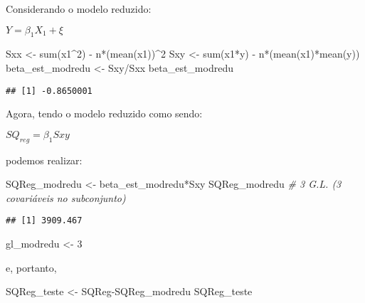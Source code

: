 \documentclass[
]{article}
\newenvironment{Shaded}{\begin{snugshade}}{\end{snugshade}}
\newcommand{\CommentTok}[1]{\textcolor[rgb]{0.56,0.35,0.01}{\textit{#1}}}
\newcommand{\DecValTok}[1]{\textcolor[rgb]{0.00,0.00,0.81}{#1}}
\newcommand{\FunctionTok}[1]{\textcolor[rgb]{0.00,0.00,0.00}{#1}}
\newcommand{\NormalTok}[1]{#1}
\newcommand{\OtherTok}[1]{\textcolor[rgb]{0.56,0.35,0.01}{#1}}
\newcommand{\SpecialCharTok}[1]{\textcolor[rgb]{0.00,0.00,0.00}{#1}}
\begin{document}
Considerando o modelo reduzido:

\(Y= \beta_1X_1 + \xi\)

\begin{Shaded}
\begin{Highlighting}[]
\NormalTok{Sxx }\OtherTok{\textless{}{-}} \FunctionTok{sum}\NormalTok{(x1}\SpecialCharTok{\^{}}\DecValTok{2}\NormalTok{) }\SpecialCharTok{{-}}\NormalTok{ n}\SpecialCharTok{*}\NormalTok{(}\FunctionTok{mean}\NormalTok{(x1))}\SpecialCharTok{\^{}}\DecValTok{2}
\NormalTok{Sxy }\OtherTok{\textless{}{-}} \FunctionTok{sum}\NormalTok{(x1}\SpecialCharTok{*}\NormalTok{y) }\SpecialCharTok{{-}}\NormalTok{ n}\SpecialCharTok{*}\NormalTok{(}\FunctionTok{mean}\NormalTok{(x1)}\SpecialCharTok{*}\FunctionTok{mean}\NormalTok{(y))}
\NormalTok{beta\_est\_modredu }\OtherTok{\textless{}{-}}\NormalTok{ Sxy}\SpecialCharTok{/}\NormalTok{Sxx}
\NormalTok{beta\_est\_modredu}
\end{Highlighting}
\end{Shaded}

\begin{verbatim}
## [1] -0.8650001
\end{verbatim}

Agora, tendo o modelo reduzido como sendo:

\(SQ_{reg} = \beta_1Sxy\)

podemos realizar:

\begin{Shaded}
\begin{Highlighting}[]
\NormalTok{SQReg\_modredu }\OtherTok{\textless{}{-}}\NormalTok{ beta\_est\_modredu}\SpecialCharTok{*}\NormalTok{Sxy}
\NormalTok{SQReg\_modredu }\CommentTok{\# 3 G.L. (3 covariáveis no subconjunto)}
\end{Highlighting}
\end{Shaded}

\begin{verbatim}
## [1] 3909.467
\end{verbatim}

\begin{Shaded}
\begin{Highlighting}[]
\NormalTok{gl\_modredu }\OtherTok{\textless{}{-}} \DecValTok{3}
\end{Highlighting}
\end{Shaded}

e, portanto,

\begin{Shaded}
\begin{Highlighting}[]
\NormalTok{SQReg\_teste }\OtherTok{\textless{}{-}}\NormalTok{ SQReg}\SpecialCharTok{{-}}\NormalTok{SQReg\_modredu}
\NormalTok{SQReg\_teste}
\end{Highlighting}
\end{Shaded}
\end{document}
